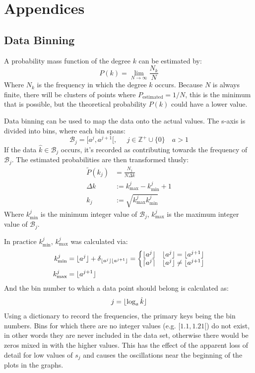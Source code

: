 \documentclass[twoside]{article}
\DeclarePairedDelimiter\ceil{\lceil}{\rceil}
\DeclarePairedDelimiter\floor{\lfloor}{\rfloor}
\begin{document}
\clearpage 

\section{Appendices}

\subsection{Data Binning}
A probability mass function of the degree $k$ can be estimated by:
\[
P(k) = \lim_{N \to \infty} \frac{N_k}{N}
\]
Where $N_k$ is the frequency in which the degree $k$ occurs. Because $N$ is always finite, there will be clusters of points where $P_{\text{estimated}}=1/N$, this is the minimum that is possible, but the theoretical probability $P(k)$ could have a lower value.

Data binning can be used to map the data onto the actual values. The s-axis is divided into bins, where each bin spans: 
\[
\mathcal{B}_j =[a^j , a^{j+1} [, \;\;\;\;\; j \in \mathbb{Z}^+ \cup \{0\} \quad a>1
\]
If the data $\hat{k} \in \mathcal{B}_j $ occurs, it's recorded as contributing towards the frequency of $ \mathcal{B}_j $. The estimated probabilities are then transformed thusly:
\begin{align*}
\widetilde{P}(k_j) &= \frac{N_j}{N \Delta k} \\
\Delta k & := k_{\text{max}}^j - k_{\text{min}}^j +1 \\
k_j & := \sqrt{k_{\text{max}}^j k_{\text{min}}^j}
\end{align*}
Where $k_{\text{min}}^j$ is the minimum integer value of $\mathcal{B}_j $, $k_{\text{max}}^j$ is the maximum integer value of  $\mathcal{B}_j $. 

In practice $k_{\text{min}}^j$, $k_{\text{max}}^j$ was calculated via:
\begin{align*}
k_{\text{min}}^j & = \floor{a^j} + \delta_{\floor{a^j} \floor{a^{j+1}}} = \left\{ \begin{matrix}\floor{a^j} \quad \floor{a^j} = \floor{a^{j+1}} \\ \ceil{a^j} \quad \floor{a^j} \neq \floor{a^{j+1}}   \end{matrix} \right. \\
k_{\text{max}}^j &= \floor{a^{j+1}} 
\end{align*}
And the bin number to which a data point should belong is calculated as:
\[
j=\floor{\log_a \hat{k}}
\]
Using a dictionary to record the frequencies, the primary keys being the bin numbers. Bins for which there are no integer values (e.g. $[1.1, 1.21 [$) do not exist, in other words they are never included in the data set, otherwise there would be zeros mixed in with the higher values. This has the effect of the apparent loss of detail for low values of $s_j$ and causes the oscillations near the beginning of the plots in the graphs.
\end{document}
